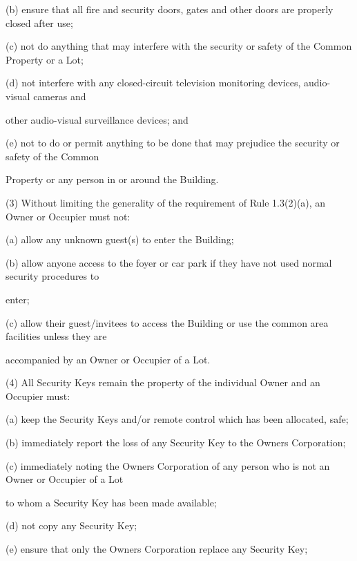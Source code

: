 \documentclass{article}
\begin{document}
{\fontsize{9.962}{1}(b) ensure that all fire and security doors, gates and other doors are properly closed after use; }

{\fontsize{9.962}{1}(c) not do anything that may interfere with the security or safety of the Common Property or a Lot; }

{\fontsize{9.962}{1}(d) not interfere with any closed-circuit television monitoring devices, audio-visual cameras and }

{\fontsize{10.02}{1}other audio-visual surveillance devices; and }

{\fontsize{9.962}{1}(e) not to do or permit anything to be done that may prejudice the security or safety of the Common }

{\fontsize{10.02}{1}Property or any person in or around the Building. }

{\fontsize{9.962}{1}(3) Without limiting the generality of the requirement of Rule 1.3(2)(a), an Owner or Occupier must not: }

{\fontsize{9.962}{1}(a) allow any unknown guest(s) to enter the Building; }

{\fontsize{9.962}{1}(b) allow anyone access to the foyer or car park if they have not used normal security procedures to }

{\fontsize{10.02}{1}enter; }

{\fontsize{9.962}{1}(c) allow their guest/invitees to access the Building or use the common area facilities unless they are }

{\fontsize{10.02}{1}accompanied by an Owner or Occupier of a Lot. }

{\fontsize{9.962}{1}(4) All Security Keys remain the property of the individual Owner and an Occupier must: }

{\fontsize{9.962}{1}(a) keep the Security Keys and/or remote control which has been allocated, safe; }

{\fontsize{9.962}{1}(b) immediately report the loss of any Security Key to the Owners Corporation; }

{\fontsize{9.962}{1}(c) immediately noting the Owners Corporation of any person who is not an Owner or Occupier of a Lot }

{\fontsize{10.02}{1}to whom a Security Key has been made available; }

{\fontsize{9.962}{1}(d) not copy any Security Key; }

{\fontsize{9.962}{1}(e) ensure that only the Owners Corporation replace any Security Key; }
\end{document}
